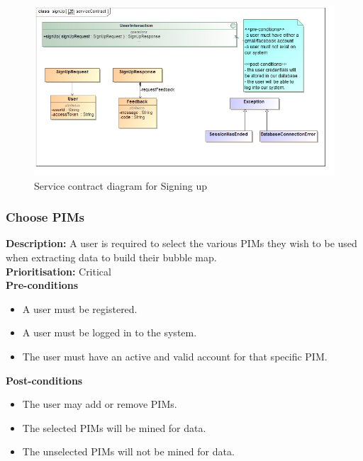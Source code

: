 \documentclass[hidelinks,english]{article}
\begin{document}
    			\begin{figure}[!h]
    			\includegraphics[width=\linewidth]{serviceContractSignUp.jpg}
    			\caption{Service contract diagram for Signing up}
    			\label{ServiceContractSignUp}
    			\end{figure}
    			
    		\subsubsection{Choose PIMs}
				\textbf{Description:}  A user is required to select the various PIMs they wish to be used when extracting data to build their bubble map.\\
    			\textbf{Prioritisation:} Critical\\
      			\textbf{Pre-conditions}
    			\begin{itemize}
        			\item A user must be registered.
        			\item A user must be logged in to the system.
        			\item The user must have an active and valid account for that specific PIM.
    			\end{itemize}
    			\textbf{Post-conditions}
     			\begin{itemize}
        			\item The user may add or remove PIMs.
        			\item The selected PIMs will be mined for data.
        			\item The unselected PIMs will not be mined for data.
    			\end{itemize}
    			
    			
    			
\end{document}
